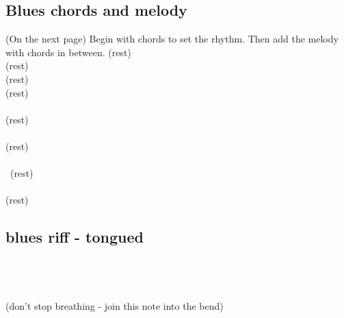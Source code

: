 
\newpage
        \subsection{Blues chords and melody}
        (On the next page)
        Begin with chords to set the rhythm. 
        Then add the melody with chords in between.
                \newpage    
            \ottd \ottb \ottd (rest)\\    
            \ottd \ottb \ottd (rest)\\
            \ottd \ottb \ottd (rest)\\    
            \ottd \ottb \ottd (rest)\\    
        \2 \3 \4  \\
        \ottd \ottb \ottd (rest)\\    
        \4\fdb\3\2   \\
        \ottd \ottb \ottd (rest)\\    
        \2 \3 \4\\\
        \ottd \ottb \ottd (rest)\\    
        \4\fdb\3\2        \\    
        \ottd \ottb \ottd (rest)\\    
            
            
            
            
        \subsection{blues riff - tongued}
            \fdta\fdta\fdta\fdta  \\
            \four\3\2         \\
            \fdta\fdta\fdta\fdta\\
            (don't stop breathing - join this note into the bend)\\
            \fdb\3\2         \\
            
            \tdta \tdta \3\four \4  \\
            \fdta\fdta\four\3\2         \\
             
             

    


